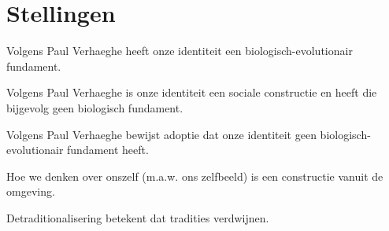 \documentclass[main.tex]{subfiles}
\begin{document}
\section{Stellingen}

\begin{examenvraag}
\begin{stelling}
Volgens Paul Verhaeghe heeft onze identiteit een biologisch-evolutionair fundament.
\end{stelling}

\begin{antwoord}
\end{antwoord}
\end{examenvraag}


\begin{examenvraag}
\begin{stelling}
Volgens Paul Verhaeghe is onze identiteit een sociale constructie en heeft die bijgevolg geen biologisch fundament.
\end{stelling}

\begin{antwoord}
\end{antwoord}
\end{examenvraag}


\begin{examenvraag}
\begin{stelling}
Volgens Paul Verhaeghe bewijst adoptie dat onze identiteit geen biologisch-evolutionair fundament heeft.
\end{stelling}

\begin{antwoord}
\end{antwoord}
\end{examenvraag}


\begin{examenvraag}
\begin{stelling}
Hoe we denken over onszelf (m.a.w. ons zelfbeeld) is een constructie vanuit de omgeving.
\end{stelling}

\begin{antwoord}
\end{antwoord}
\end{examenvraag}


\begin{examenvraag}
\begin{stelling}
Detraditionalisering betekent dat tradities verdwijnen.
\end{stelling}

\begin{antwoord}
\end{antwoord}
\end{examenvraag}
\end{document}
